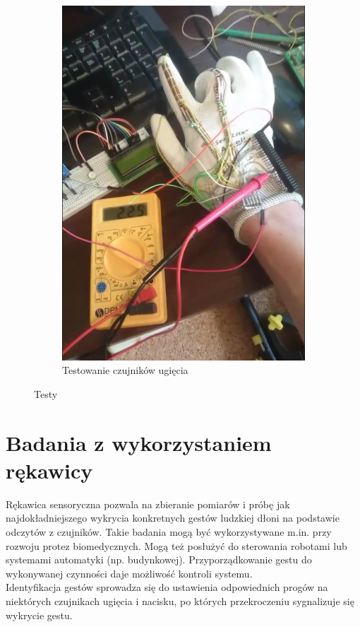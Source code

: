 \documentclass[12pt,a4paper]{article}
\begin{document}
\begin{figure}[htb!]
\begin{subfigure}{.5\textwidth}
	\includegraphics[width=.9\textwidth]{images/ugiecie.png}
	\caption{Testowanie czujników ugięcia}
	\label{fig:ugiecie}
\end{subfigure}
\caption{Testy}
\label{fig:testy}
\end{figure}



\newpage
\section{Badania z wykorzystaniem rękawicy}
Rękawica sensoryczna pozwala na zbieranie pomiarów i próbę jak najdokładniejszego wykrycia konkretnych gestów ludzkiej dłoni na podstawie odczytów z czujników. Takie badania mogą być wykorzystywane m.in. przy rozwoju protez biomedycznych. Mogą też posłużyć do sterowania robotami lub systemami automatyki (np. budynkowej). Przyporządkowanie gestu do wykonywanej czynności daje możliwość kontroli systemu.\\
Identyfikacja gestów sprowadza się do ustawienia odpowiednich progów na niektórych czujnikach ugięcia i nacisku, po których przekroczeniu sygnalizuje się wykrycie gestu.
\end{document}
